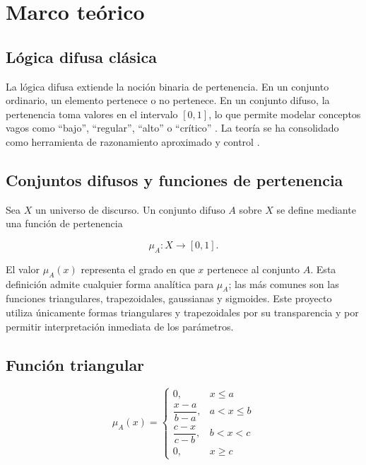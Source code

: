 \section{Marco teórico}

\subsection{Lógica difusa clásica}

La lógica difusa extiende la noción binaria de pertenencia. En un conjunto ordinario, un elemento pertenece o no pertenece. En un conjunto difuso, la pertenencia toma valores en el intervalo $[0,1]$, lo que permite modelar conceptos vagos como ``bajo'', ``regular'', ``alto'' o ``crítico'' \citep{zadeh1965fuzzy,klir1995fuzzy,zimmermann2001fuzzy}. La teoría se ha consolidado como herramienta de razonamiento aproximado y control \citep{ross2010fuzzy,pedrycz1998introduction}.

\subsection{Conjuntos difusos y funciones de pertenencia}

Sea $X$ un universo de discurso. Un conjunto difuso $A$ sobre $X$ se define mediante una función de pertenencia

\begin{equation}
\mu_A:X\rightarrow[0,1].
\label{eq:membership-base}
\end{equation}

El valor $\mu_A(x)$ representa el grado en que $x$ pertenece al conjunto $A$. Esta definición admite cualquier forma analítica para $\mu_A$; las más comunes son las funciones triangulares, trapezoidales, gaussianas y sigmoides. Este proyecto utiliza únicamente formas triangulares y trapezoidales por su transparencia y por permitir interpretación inmediata de los parámetros.

\subsection{Función triangular}

\begin{equation}
\mu_A(x)=
\begin{cases}
0, & x \leq a \\
\dfrac{x-a}{b-a}, & a < x \leq b \\
\dfrac{c-x}{c-b}, & b < x < c \\
0, & x \geq c
\end{cases}
\label{eq:triangular}
\end{equation}

